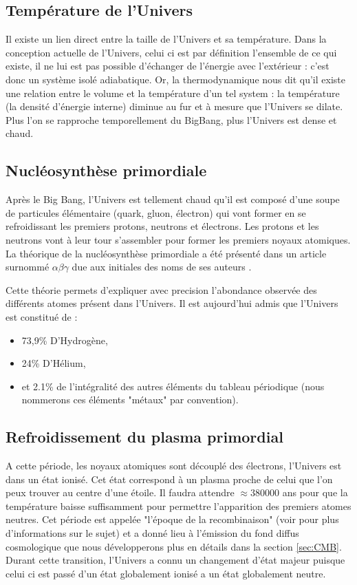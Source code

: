 \subsection{Température de l'Univers}

Il existe un lien direct entre la taille de l'Univers et sa température.
Dans la conception actuelle de l'Univers, celui ci est par définition l'ensemble de ce qui existe, il ne lui est pas possible d'échanger de l’énergie avec l’extérieur : c'est donc un système isolé adiabatique.
Or, la thermodynamique nous dit qu'il existe une relation entre le volume et la température d'un tel system : la température (la densité d'énergie interne) diminue au fur et à mesure que l'Univers se dilate.
Plus l'on se rapproche temporellement du BigBang, plus l'Univers est dense et chaud.

\subsection{Nucléosynthèse primordiale}
\label{sec:nucleosynthese_primordiale}
Après le Big Bang, l'Univers est tellement chaud qu'il est composé d'une soupe de particules élémentaire (quark, gluon, électron) qui vont former en se refroidissant les premiers protons, neutrons et électrons.
Les protons et les neutrons vont à leur tour s'assembler pour former les premiers noyaux atomiques.
La théorique de la nucléosynthèse primordiale a été présenté dans un article surnommé $\alpha \beta \gamma$ due aux initiales des noms de ses auteurs \citep{PhysRev.73.803}.

Cette théorie permets d'expliquer avec precision l'abondance observée des différents atomes présent dans l'Univers.
Il est aujourd'hui admis que l'Univers est constitué de : 

\begin{itemize}
\item 73,9\% D’Hydrogène,
\item 24\% D’Hélium,
\item et 2.1\% de l'intégralité des autres éléments du tableau périodique  (nous nommerons  ces éléments "métaux" par convention).
\end{itemize}

\subsection{Refroidissement du plasma primordial}
A cette période, les noyaux atomiques sont découplé des électrons, l'Univers est dans un état ionisé.
Cet état correspond à un plasma proche de celui que l'on peux trouver au centre d'une étoile.
Il faudra attendre $\approx 380 000$ ans pour que la température baisse suffisamment pour permettre l'apparition des premiers atomes neutres.
Cet période est appelée "l'époque de la recombinaison" (voir \cite{2009AN....330..657S} pour plus d'informations sur le sujet) et a donné lieu à l'émission du fond diffus cosmologique que nous développerons plus en détails dans la section \ref{sec:CMB}.
Durant cette transition, l'Univers a connu un changement d'état majeur puisque celui ci est passé d'un état globalement ionisé a un état globalement neutre.

